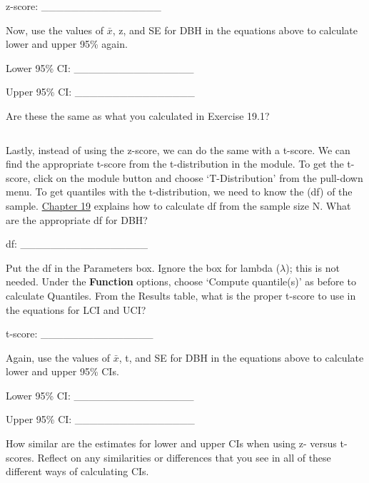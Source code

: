 \documentclass[
  openany]{krantz}
\begin{document}
z-score: \_\_\_\_\_\_\_\_\_\_\_\_\_\_\_\_

Now, use the values of \(\bar{x}\), z, and SE for DBH in the equations above to calculate lower and upper 95\%  again.

Lower 95\% CI: \_\_\_\_\_\_\_\_\_\_\_\_\_\_\_\_

Upper 95\% CI: \_\_\_\_\_\_\_\_\_\_\_\_\_\_\_\_

Are these  the same as what you calculated in Exercise 19.1?

\begin{verbatim}
\end{verbatim}

Lastly, instead of using the z-score, we can do the same with a t-score.
We can find the appropriate t-score from the t-distribution in the  module.
To get the t-score, click on the  module button and choose `T-Distribution' from the pull-down menu.
To get quantiles with the t-distribution, we need to know the  (df) of the sample.
\protect\hyperlink{Chapter_19}{Chapter 19} explains how to calculate df from the sample size N.
What are the appropriate df for DBH?

df: \_\_\_\_\_\_\_\_\_\_\_\_\_\_\_\_\_

Put the df in the Parameters box.
Ignore the box for lambda (\(\lambda\)); this is not needed.
Under the \textbf{Function} options, choose `Compute quantile(s)' as before to calculate Quantiles.
From the Results table, what is the proper t-score to use in the equations for LCI and UCI?

t-score: \_\_\_\_\_\_\_\_\_\_\_\_\_\_\_

Again, use the values of \(\bar{x}\), t, and SE for DBH in the equations above to calculate lower and upper 95\% CIs.

Lower 95\% CI: \_\_\_\_\_\_\_\_\_\_\_\_\_\_\_\_

Upper 95\% CI: \_\_\_\_\_\_\_\_\_\_\_\_\_\_\_\_

How similar are the estimates for lower and upper CIs when using z- versus t-scores.
Reflect on any similarities or differences that you see in all of these different ways of calculating CIs.

\begin{verbatim}




\end{verbatim}
\end{document}
